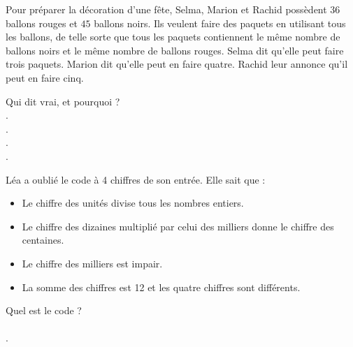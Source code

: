 \documentclass[a4paper]{article}
\begin{document}
\begin{question}[(2,5 points)]
	Pour préparer la décoration d’une fête, Selma, Marion et Rachid possèdent $36$ ballons rouges et $45$ ballons noirs. Ils veulent faire des paquets en utilisant tous les ballons, de telle sorte que tous les paquets contiennent le même nombre de ballons noirs et le même nombre de ballons rouges. Selma dit qu’elle peut faire trois paquets. Marion dit qu’elle peut en faire quatre. Rachid leur
	annonce qu’il peut en faire cinq.

	Qui dit vrai, et pourquoi ? \\[0.5cm]
	.\dotfill \\[0.5cm]
	.\dotfill \\[0.5cm]
	.\dotfill \\[0.5cm]
	.\dotfill
\end{question}

\begin{question}[(2,5 points)]
	Léa a oublié le code à 4 chiffres de son entrée. Elle sait que :
	\begin{itemize}
		\setlength\itemsep{0.3em}
		\item[] Le chiffre des unités divise tous les nombres entiers.
		\item[] Le chiffre des dizaines multiplié par celui des milliers donne le chiffre des centaines.
		\item[] Le chiffre des milliers est impair.
		\item[] La somme des chiffres est 12 et les quatre chiffres sont différents.
	\end{itemize}

	Quel est le code ? \\ \\
	.\dotfill
\end{question}
\end{document}
